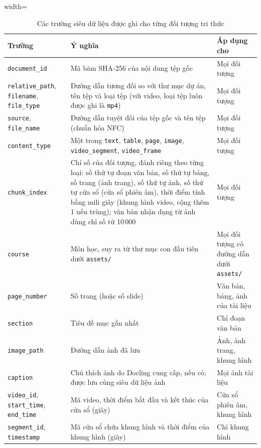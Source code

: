 \begin{table}[ht]
    \centering
    \caption{Các trường siêu dữ liệu được ghi cho từng đối tượng tri thức}
    \label{tab:metadata}
    \begin{adjustbox}{width=\textwidth}
    \begin{tabular}{|l|p{7.2cm}|p{3.4cm}|}
    \hline
    \textbf{Trường} & \textbf{Ý nghĩa} & \textbf{Áp dụng cho} \\
    \hline
    \texttt{document\_id} & Mã băm SHA-256 của nội dung tệp gốc & Mọi đối tượng \\
    \hline
    \texttt{relative\_path}, \texttt{filename}, \texttt{file\_type} & Đường dẫn tương đối so với thư mục dự án, tên tệp và loại tệp (với video, loại tệp luôn được ghi là \texttt{mp4}) & Mọi đối tượng \\
    \hline
    \texttt{source}, \texttt{file\_name} & Đường dẫn tuyệt đối của tệp gốc và tên tệp (chuẩn hóa NFC) & Mọi đối tượng \\
    \hline
    \texttt{content\_type} & Một trong \texttt{text}, \texttt{table}, \texttt{page}, \texttt{image}, \texttt{video\_segment}, \texttt{video\_frame} & Mọi đối tượng \\
    \hline
    \texttt{chunk\_index} & Chỉ số của đối tượng, đánh riêng theo từng loại: số thứ tự đoạn văn bản, số thứ tự bảng, số trang (ảnh trang), số thứ tự ảnh, số thứ tự cửa sổ (cửa sổ phiên âm), thời điểm tính bằng mili giây (khung hình video, cộng thêm 1 nếu trùng); văn bản nhận dạng từ ảnh dùng chỉ số từ 10\,000 & Mọi đối tượng \\
    \hline
    \texttt{course} & Môn học, suy ra từ thư mục con đầu tiên dưới \texttt{assets/} & Mọi đối tượng có đường dẫn dưới \texttt{assets/} \\
    \hline
    \texttt{page\_number} & Số trang (hoặc số slide) & Văn bản, bảng, ảnh của tài liệu \\
    \hline
    \texttt{section} & Tiêu đề mục gần nhất & Chỉ đoạn văn bản \\
    \hline
    \texttt{image\_path} & Đường dẫn ảnh đã lưu & Ảnh, ảnh trang, khung hình \\
    \hline
\texttt{caption} & Chú thích ảnh do Docling cung cấp, nếu có; được lưu cùng siêu dữ liệu ảnh & Mọi ảnh tài liệu \\
    \hline
    \texttt{video\_id}, \texttt{start\_time}, \texttt{end\_time} & Mã video, thời điểm bắt đầu và kết thúc của cửa sổ (giây) & Cửa sổ phiên âm, khung hình \\
    \hline
    \texttt{segment\_id}, \texttt{timestamp} & Mã cửa sổ chứa khung hình và thời điểm của khung hình (giây) & Chỉ khung hình \\
    \hline
    \end{tabular}
    \end{adjustbox}
\end{table}

